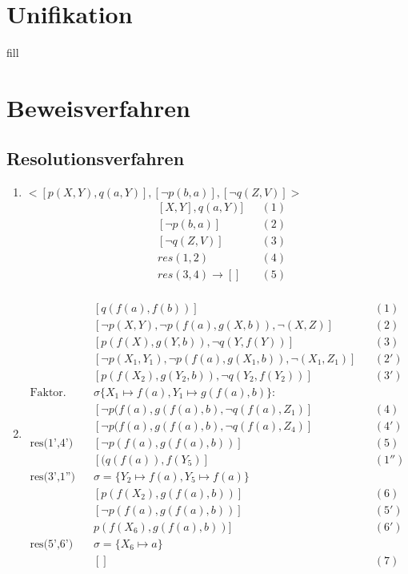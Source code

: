 \section{Unifikation}
fill
\section{Beweisverfahren}
\subsection{Resolutionsverfahren}
\begin{enumerate}
	\item $<[p(X,Y),q(a,Y)],[\neg p(b,a)],[\neg q(Z,V)]>$
	\begin{align*}
	&[X,Y],q(a,Y)] &&(1)\\
	&[\neg p(b,a)] &&(2)\\
	&[\neg q(Z,V)] &&(3)\\
	&res(1,2) &&(4)\\
	&res(3,4) \to [] &&(5)\\
	\end{align*}
	\item
	\begin{align*}
		&[q(f(a),f(b))] &&(1)\\
		&[\neg p(X,Y),\neg p(f(a),g(X,b)),\neg(X,Z)]&&(2)\\
		&[p(f(X),g(Y,b)),\neg q(Y,f(Y))] &&(3)\\
		&[\neg p(X_1,Y_1),\neg p(f(a),g(X_1,b)),\neg(X_1,Z_1)]&&(2')\\
		&[p(f(X_2),g(Y_2,b)),\neg q(Y_2,f(Y_2))] &&(3')\\
		\text{Faktor. von 2' }& \sigma\{X_1 \mapsto f(a), Y_1 \mapsto g(f(a),b)\}: \\
		&[\neg p(f(a),g(f(a),b),\neg q(f(a),Z_1)] &&(4)\\
		&[\neg p(f(a),g(f(a),b),\neg q(f(a),Z_4)] &&(4')\\
		\text{res(1',4') }&[\neg p(f(a),g(f(a),b))]&&(5)\\
		&[(q(f(a)),f(Y_5)] &&(1'')\\
		\text{res(3',1'') } &\sigma = \{Y_2 \mapsto f(a), Y_5 \mapsto f(a)\}\\
		&[p(f(X_2),g(f(a),b))] &&(6)\\
		& [\neg p(f(a),g(f(a),b))] &&(5')\\
		& p(f(X_6),g(f(a),b))] &&(6')\\
		\text{res(5',6') }& \sigma = \{X_6 \mapsto a\}\\
		&[] &&(7)
	\end{align*}
\end{enumerate}
